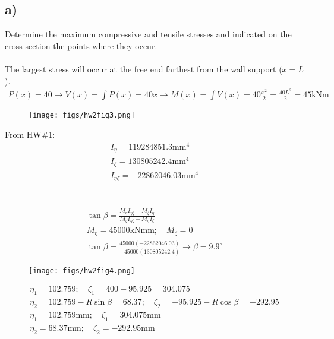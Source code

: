 \documentclass[12 pt]{article}
\begin{document}
\subsection*{a)}
Determine the maximum compressive and tensile stresses and indicated on the cross
section the points where they occur. \\ \\
The largest stress will occur at the free end farthest from the wall support ($x=L$).
\begin{align*}
    P(x) = 40 \rightarrow V(x)=\int{P(x)}=40x \rightarrow M(x)=\int{V(x)} = 40\frac{x^2}{2}=\frac{40L^2}{2}
    = 45 \textrm{kNm}
\end{align*}
\begin{figure}[H]
    \centering
    \texttt{[image: figs/hw2fig3.png]}
\end{figure} \par
From HW\#1:
\begin{align*}
    I_{\eta} = 119284851.3\textrm{mm}^4 \\
    I_{\zeta}=130805242.4\textrm{mm}^4\\
    I_{\eta \zeta}=-22862046.03\textrm{mm}^4
\end{align*} \\ \\
\begin{align*}
    \tan{\beta}=\frac{M_{\eta}I_{\eta \zeta}-M_{\zeta}I_{\eta}}{M_{\zeta}I_{\eta \zeta}-M_{\eta}I_{\zeta}} \\
    M_{\eta}=45000\textrm{kNmm};\quad M_{\zeta}=0 \\
    \tan{\beta}=\frac{45000(-22862046.03)}{-45000(130805242.4)} \rightarrow \beta=9.9^{\circ}
\end{align*}
\begin{figure}[H]
    \centering
    \texttt{[image: figs/hw2fig4.png]}
\end{figure} \par
\begin{align*}
    \eta_1 = 102.759;\quad \zeta_1=400-95.925=304.075 \\
    \eta_2 = 102.759-R\sin{\beta}=68.37;\quad \zeta_2=-95.925-R\cos{\beta}=-292.95 \\
    \eta_1 = 102.759\textrm{mm};\quad \zeta_1=304.075\textrm{mm} \\
    \eta_2 = 68.37\textrm{mm};\quad \zeta_2=-292.95\textrm{mm}
\end{align*} \\ \\
\end{document}

